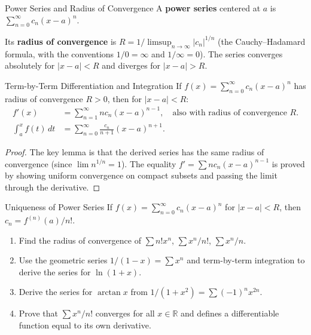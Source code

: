 \documentclass[12pt, openany]{book}
\theoremstyle{plain}
\theoremstyle{definition}
\theoremstyle{remark}
\newcommand{\R}{\mathbb{R}}
\begin{document}
\begin{defbox}{Power Series and Radius of Convergence}
A \textbf{power series} centered at $a$ is $\sum_{n=0}^\infty c_n(x-a)^n$.

Its \textbf{radius of convergence} is $R = 1/\limsup_{n\to\infty} |c_n|^{1/n}$ (the Cauchy--Hadamard formula, with the conventions $1/0 = \infty$ and $1/\infty = 0$). The series converges absolutely for $|x-a| < R$ and diverges for $|x-a| > R$.
\end{defbox}
\color{black}

\begin{thmbox}{Term-by-Term Differentiation and Integration}
If $f(x) = \sum_{n=0}^\infty c_n(x-a)^n$ has radius of convergence $R > 0$, then for $|x-a| < R$:
\begin{align*}
  f'(x) &= \sum_{n=1}^\infty n c_n(x-a)^{n-1}, \quad \text{also with radius of convergence } R. \\
  \int_a^x f(t)\,dt &= \sum_{n=0}^\infty \frac{c_n}{n+1}(x-a)^{n+1}.
\end{align*}
\end{thmbox}
\color{black}

\begin{proof}
The key lemma is that the derived series has the same radius of convergence (since $\lim n^{1/n} = 1$). The equality $f' = \sum nc_n(x-a)^{n-1}$ is proved by showing uniform convergence on compact subsets and passing the limit through the derivative.
\end{proof}

\begin{thmbox}{Uniqueness of Power Series}
If $f(x) = \sum_{n=0}^\infty c_n(x-a)^n$ for $|x-a| < R$, then $c_n = f^{(n)}(a)/n!$.
\end{thmbox}
\color{black}

\begin{exbox}
\begin{enumerate}
  \item Find the radius of convergence of $\sum n! x^n$, $\sum x^n/n!$, $\sum x^n/n$.
  \item Use the geometric series $1/(1-x) = \sum x^n$ and term-by-term integration to derive the series for $\ln(1+x)$.
  \item Derive the series for $\arctan x$ from $1/(1+x^2) = \sum (-1)^n x^{2n}$.
  \item Prove that $\sum x^n/n!$ converges for all $x \in \R$ and defines a differentiable function equal to its own derivative.
\end{enumerate}
\end{exbox}
\color{black}
\end{document}
